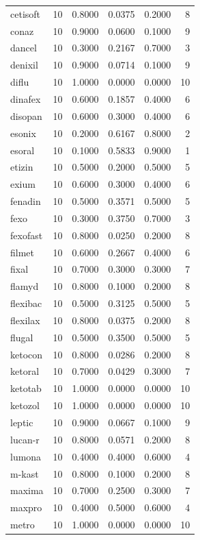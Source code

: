 \begin{longtable}{p{3.0cm}rrrrr}
cetisoft & 10 & 0.8000 & 0.0375 & 0.2000 & 8 \\
conaz & 10 & 0.9000 & 0.0600 & 0.1000 & 9 \\
dancel & 10 & 0.3000 & 0.2167 & 0.7000 & 3 \\
denixil & 10 & 0.9000 & 0.0714 & 0.1000 & 9 \\
diflu & 10 & 1.0000 & 0.0000 & 0.0000 & 10 \\
dinafex & 10 & 0.6000 & 0.1857 & 0.4000 & 6 \\
disopan & 10 & 0.6000 & 0.3000 & 0.4000 & 6 \\
esonix & 10 & 0.2000 & 0.6167 & 0.8000 & 2 \\
esoral & 10 & 0.1000 & 0.5833 & 0.9000 & 1 \\
etizin & 10 & 0.5000 & 0.2000 & 0.5000 & 5 \\
exium & 10 & 0.6000 & 0.3000 & 0.4000 & 6 \\
fenadin & 10 & 0.5000 & 0.3571 & 0.5000 & 5 \\
fexo & 10 & 0.3000 & 0.3750 & 0.7000 & 3 \\
fexofast & 10 & 0.8000 & 0.0250 & 0.2000 & 8 \\
filmet & 10 & 0.6000 & 0.2667 & 0.4000 & 6 \\
fixal & 10 & 0.7000 & 0.3000 & 0.3000 & 7 \\
flamyd & 10 & 0.8000 & 0.1000 & 0.2000 & 8 \\
flexibac & 10 & 0.5000 & 0.3125 & 0.5000 & 5 \\
flexilax & 10 & 0.8000 & 0.0375 & 0.2000 & 8 \\
flugal & 10 & 0.5000 & 0.3500 & 0.5000 & 5 \\
ketocon & 10 & 0.8000 & 0.0286 & 0.2000 & 8 \\
ketoral & 10 & 0.7000 & 0.0429 & 0.3000 & 7 \\
ketotab & 10 & 1.0000 & 0.0000 & 0.0000 & 10 \\
ketozol & 10 & 1.0000 & 0.0000 & 0.0000 & 10 \\
leptic & 10 & 0.9000 & 0.0667 & 0.1000 & 9 \\
lucan-r & 10 & 0.8000 & 0.0571 & 0.2000 & 8 \\
lumona & 10 & 0.4000 & 0.4000 & 0.6000 & 4 \\
m-kast & 10 & 0.8000 & 0.1000 & 0.2000 & 8 \\
maxima & 10 & 0.7000 & 0.2500 & 0.3000 & 7 \\
maxpro & 10 & 0.4000 & 0.5000 & 0.6000 & 4 \\
metro & 10 & 1.0000 & 0.0000 & 0.0000 & 10 \\

\end{longtable}
